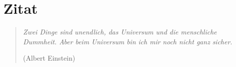\chapter*{Zitat}
\label{cha:Zitat}

\thispagestyle{empty}

\begin{center}
\begin{minipage}{14cm}
\begin{verse}
\textit{Zwei Dinge sind unendlich, das Universum und die menschliche Dummheit. Aber beim Universum bin ich mir noch nicht ganz sicher.}

(Albert Einstein)
\end{verse}
\end{minipage}
\end{center}
